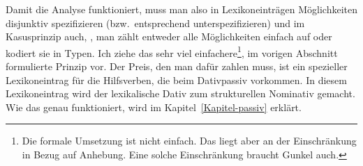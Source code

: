 \z
Damit die Analyse funktioniert, muss man also in Lexikoneinträgen Möglichkeiten disjunktiv spezifizieren (bzw.\
entsprechend unterspezifizieren) und im Kasusprinzip auch, \dash, man zählt entweder
alle Möglichkeiten einfach auf oder kodiert sie in Typen. 
Ich ziehe das sehr viel einfachere\footnote{
  Die formale Umsetzung ist nicht einfach. Das liegt aber an der Einschränkung in Bezug auf Anhebung.
  Eine solche Einschränkung braucht Gunkel auch.%
}, im vorigen Abschnitt formulierte Prinzip
vor. Der Preis, den man dafür zahlen muss, ist ein spezieller
Lexikoneintrag für die Hilfsverben, die beim Dativpassiv vorkommen. In diesem Lexikoneintrag
wird der lexikalische Dativ zum strukturellen Nominativ gemacht. Wie das genau funktioniert,
wird im Kapitel~\ref{Kapitel-passiv} erklärt.

